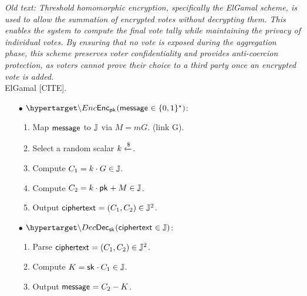 \textit{Old text: Threshold homomorphic encryption, specifically the ElGamal scheme, is used to allow the summation of encrypted votes without decrypting them. This enables the system to compute the final vote tally while maintaining the privacy of individual votes. By ensuring that no vote is exposed during the aggregation phase, this scheme preserves voter confidentiality and provides anti-coercion protection, as voters cannot prove their choice to a third party once an encrypted vote is added.}\\

ElGamal [CITE].

\medskip

\begin{mdframed}
	\begin{minipage}[t]{0.54\textwidth}
		\begin{itemize}
			\item[$\bullet$] $\hlset{\Enc}_{\pk}(\msg \in \{0,1\}^\star)$:  \vspace{0.1cm}
			\begin{enumerate}
				\item Map ${\sf{message}^{}}$ to $\mathbb{J}$ via $M = mG$. (link G).
				\item Select a random scalar $k \xleftarrow{\$} $.
				\item Compute $C_1 = k \cdot G \in \mathbb{J}$.
				\item Compute $C_2 = k \cdot {\sf{pk}^{}} + M \in \mathbb{J}$. 
				\item Output ${\sf{ciphertext}^{}} = (C_1, C_2) \in \mathbb{J}^2$.
			\end{enumerate}
		\end{itemize}
	\end{minipage}
	\begin{minipage}[t]{0.44\textwidth}
		\begin{itemize}
			\item[$\bullet$] $\hlset{\Dec}_{\sk}(\enc \in \J)$: \vspace{0.1cm}
			\begin{enumerate}
				
				
				\item Parse ${\sf{ciphertext}^{}} = (C_1, C_2) \in \mathbb{J}^2$.
				\item Compute $K = {\sf{sk}^{}} \cdot C_1 \in \mathbb{J}$.
				\item Output ${\sf{message}^{}} = C_2 - K$. 
			\end{enumerate}
		\end{itemize}
	\end{minipage}
\end{mdframed}

